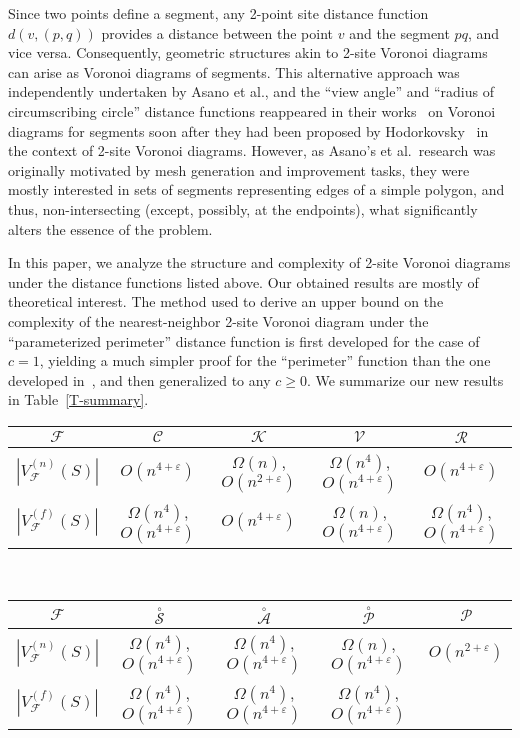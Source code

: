 \documentclass[10pt, conference, compsocconf]{IEEEtran}
\def\C{{\mathcal C}}
\def\F{{\mathcal F}}
\def\K{{\mathcal K}}
\def\R{{\mathcal R}}
\def\PP{{\mathcal P}}
\def\V{{\mathcal V}}
\def\XA{{\stackrel{\circ}{\mathcal A}}}
\def\XP{{\stackrel{\circ}{\mathcal P}}}
\def\XS{{\stackrel{\circ}{\mathcal S}}}
\newcommand{\eps}{\varepsilon}
\begin{document}
Since two points define a segment, any 2-point site distance function
$d(v,(p,q))$ provides a distance between the point $v$ and the segment $pq$,
and vice versa.  Consequently, geometric structures akin to 2-site Voronoi
diagrams can arise as Voronoi diagrams of segments.  This alternative approach
was independently undertaken by Asano et al., and the ``view angle'' and
``radius of circumscribing circle'' distance functions reappeared in their
works~\cite{AKTT06,AKTT07} on Voronoi diagrams for segments soon after they
had been proposed by Hodorkovsky~\cite{H05} in the context of 2-site Voronoi
diagrams.  However, as Asano's et al.\ research was originally motivated by
mesh generation and improvement tasks, they were mostly interested in sets of
segments representing edges of a simple polygon, and thus, non-intersecting
(except, possibly, at the endpoints), what significantly alters the essence
of the problem.

In this paper, we analyze the structure and complexity of 2-site Voronoi
diagrams under the distance functions listed above.  Our obtained results are
mostly of theoretical interest.  The method used to derive an upper bound on
the complexity of the nearest-neighbor 2-site Voronoi diagram under the ``parameterized
perimeter'' distance function is first developed for the case of $c=1$,
yielding a much simpler proof for the ``perimeter'' function than the one
developed in~\cite{HB09}, and then generalized to any $c \geq 0$.
We summarize our new results in Table~\ref{T-summary}.
\begin{table*}
   \centering
   \begin{tabular}{|c||c|c|c|c|}
      \hline
      $\F$ & $\C$ & $\K$ & $\V$ & $\R$ \\
      \hline
      $|V_\F^{(n)}(S)|$ & $O(n^{4+\eps})$ & $\Omega(n)$, $O(n^{2+\eps})$ &
         $\Omega(n^4)$, $O(n^{4+\eps})$ & $O(n^{4+\eps})$ \\
      \hline
      $|V_\F^{(f)}(S)|$ & $\Omega(n^4)$, $O(n^{4+\eps})$ & $O(n^{4+\eps})$ &
         $\Omega(n)$, $O(n^{4+\eps})$ & $\Omega(n^4)$, $O(n^{4+\eps})$ \\
      \hline
   \end{tabular} \\
   \begin{tabular}{|c||c|c|c|c|}
      \hline
      $\F$ & $\XS$ & $\XA$ & $\XP$ & $\PP$ \\
      \hline
      $|V_\F^{(n)}(S)|$ & $\Omega(n^4)$, $O(n^{4+\eps})$ &
         $\Omega(n^4)$, $O(n^{4+\eps})$ & $\Omega(n)$, $O(n^{4+\eps})$ &
         $O(n^{2+\eps})$ \\
      \hline
      $|V_\F^{(f)}(S)|$ & $\Omega(n^4)$, $O(n^{4+\eps})$ &
         $\Omega(n^4)$, $O(n^{4+\eps})$ & $\Omega(n^4)$, $O(n^{4+\eps})$ & \\
      \hline
   \end{tabular}
   \caption{Our results:  Worst-case combinatorial complexities of 2-site
            Voronoi diagrams of a set $S$ of $n$ points with respect to
            different distance functions}
   \label{T-summary}
\end{table*}
\end{document}
